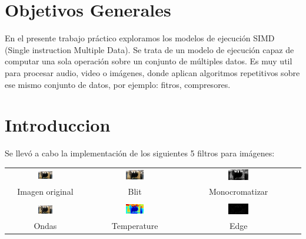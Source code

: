 \documentclass[a4paper]{article}
\begin{document}
%
\section{Objetivos Generales}
En el presente trabajo práctico exploramos los modelos de ejecución SIMD (Single instruction Multiple Data). Se trata de un modelo de ejecución capaz de computar una sola operación sobre un conjunto de múltiples datos. \newline
Es muy util para procesar audio, video o imágenes, donde aplican algoritmos repetitivos sobre ese mismo conjunto de datos, por ejemplo: fitros, compresores. 
	


%
\section{Introduccion}


Se llevó a cabo la implementación de los siguientes 5 filtros para imágenes:

\begin{center}
 \begin{tabular}{cccc}
   \includegraphics[width=0.2\textwidth]{imagenes/island.png} &
   \includegraphics[width=0.2\textwidth]{imagenes/island-blit.png} &
   \includegraphics[width=0.2\textwidth]{imagenes/island-monocromatizar.png} \\
   Imagen original & Blit & Monocromatizar \\
   \\
   \includegraphics[width=0.2\textwidth]{imagenes/island-ondas.png} &
   \includegraphics[width=0.2\textwidth]{imagenes/island-temperature.png} &
   \includegraphics[width=0.2\textwidth]{imagenes/island-edge.png} \\
   Ondas & Temperature & Edge \\
 \end{tabular}
\end{center}
  
\end{document}
